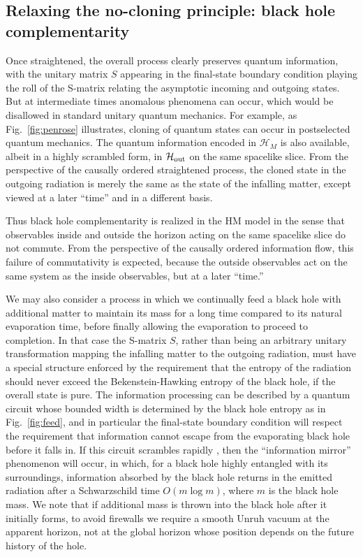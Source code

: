 \documentclass[11pt]{article}
\begin{document}
\subsection{Relaxing the no-cloning principle: black hole complementarity}
Once straightened, the overall process clearly preserves quantum information, with the unitary matrix $S$ appearing in the final-state boundary condition playing the roll of the S-matrix relating the asymptotic incoming and outgoing states. But at intermediate times anomalous phenomena can occur, which would be disallowed in standard unitary quantum mechanics. For example, as Fig.~\ref{fig:penrose} illustrates, cloning of quantum states can occur in postselected quantum mechanics. The quantum information encoded in $\mathcal{H}_M$ is also available, albeit in a highly scrambled form, in $\mathcal{H}_{\rm out}$ on the same spacelike slice. From the perspective of the causally ordered straightened process, the cloned state in the outgoing radiation is merely the same as the state of the infalling matter, except viewed at a later ``time'' and in a different basis.

Thus black hole complementarity is realized in the HM model in the sense that observables inside and outside the horizon acting on the same spacelike slice do not commute. From the perspective of the causally ordered information flow, this failure of commutativity is expected, because the outside observables act on the same system as the inside observables, but at a later ``time.''

We may also consider a process in which we continually feed a black hole with additional matter to maintain its mass for a long time compared to its natural evaporation time, before finally allowing the evaporation to proceed to completion. In that case the S-matrix $S$, rather than being an arbitrary unitary transformation mapping the infalling matter to the outgoing radiation, must have a special structure enforced by the requirement that the entropy of the radiation should never exceed the Bekenstein-Hawking entropy of the black hole, if the overall state is pure. The information processing can be described by a quantum circuit whose bounded width is determined by the black hole entropy as in Fig.~\ref{fig:feed}, and in particular the final-state boundary condition will respect the requirement that information cannot escape from the evaporating black hole before it falls in. If this circuit scrambles rapidly \cite{sekino}, then the ``information mirror'' phenomenon \cite{hayden} will occur, in which, for a black hole highly entangled with its surroundings, information absorbed by the black hole returns in the emitted radiation after a Schwarzschild time $O( m \log m)$, where $m$ is the black hole mass. We note that if additional mass is thrown into the black hole after it initially forms, to avoid firewalls we require a smooth Unruh vacuum at the apparent horizon, not at the global horizon whose position depends on the future history of the hole. 
\end{document}
